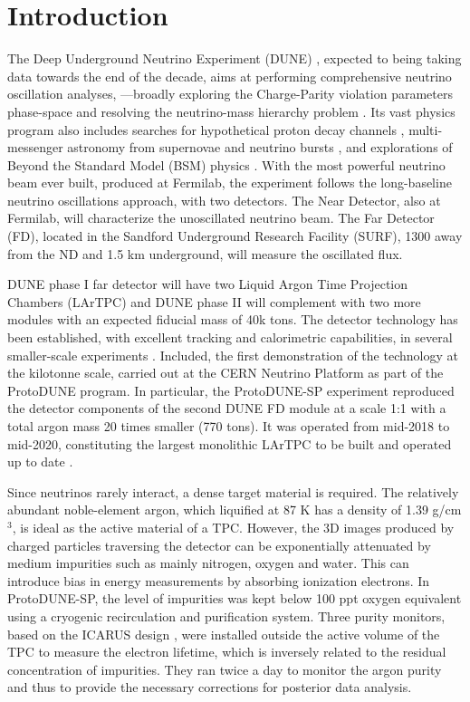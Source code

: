 \section{Introduction}
\label{sec:introduction}

The Deep Underground Neutrino Experiment (DUNE) \cite{dune_tdr1}, expected to being taking data towards the end of the decade, aims at performing comprehensive neutrino oscillation analyses, ---broadly exploring the Charge-Parity violation parameters phase-space and resolving the neutrino-mass hierarchy problem \cite{bib:dune_osc}. Its vast physics program also includes searches for hypothetical proton decay channels \cite{bib:dune_tdr2}, multi-messenger astronomy from supernovae and neutrino bursts \cite{bib:dune_supernova}, and explorations of Beyond the Standard Model (BSM) physics \cite{bib:dune_bsm}. With the most powerful neutrino beam ever built, produced at Fermilab, the experiment follows the long-baseline neutrino oscillations approach, with two detectors. The Near Detector, also at Fermilab, will characterize the unoscillated neutrino beam. The Far Detector (FD), located in the Sandford Underground Research Facility (SURF), 1300 away from the ND and 1.5 km underground, will measure the oscillated flux.

DUNE phase I far detector will have two Liquid Argon Time Projection Chambers (LArTPC) and DUNE phase II will complement with two more modules with an expected fiducial mass of 40k tons. The detector technology has been established, with excellent tracking and calorimetric capabilities, in several smaller-scale experiments \cite{icarus,microboone}. Included, the first demonstration of the technology at the kilotonne scale, carried out at the CERN Neutrino Platform as part of the ProtoDUNE program. In particular, the ProtoDUNE-SP experiment \cite{pdsp_tdr} reproduced the detector components of the second DUNE FD module \cite{dune_tdr4} at a scale 1:1 with a total argon mass 20 times smaller (770 tons). It was operated from mid-2018 to mid-2020, constituting the largest monolithic LArTPC to be built and operated up to date \cite{pdsp_1,pdsp_2}.

Since neutrinos rarely interact, a dense target material is required. The relatively abundant noble-element argon, which liquified at 87 K has a density of 1.39 g/cm$^{3}$, is ideal as the active material of a TPC. However, the 3D images produced by charged particles traversing the detector can be exponentially attenuated by medium impurities such as mainly nitrogen, oxygen and water. This can introduce bias in energy measurements by absorbing ionization electrons. In ProtoDUNE-SP, the level of impurities was kept below 100 ppt oxygen equivalent \cite{pdsp_tdr} using a cryogenic recirculation and purification system. Three purity monitors, based on the ICARUS design \cite{PrMs}, were installed outside the active volume of the TPC to measure the electron lifetime, which is inversely related to the residual concentration of impurities. They ran twice a day to monitor the argon purity and thus to provide the necessary corrections for posterior data analysis. 


